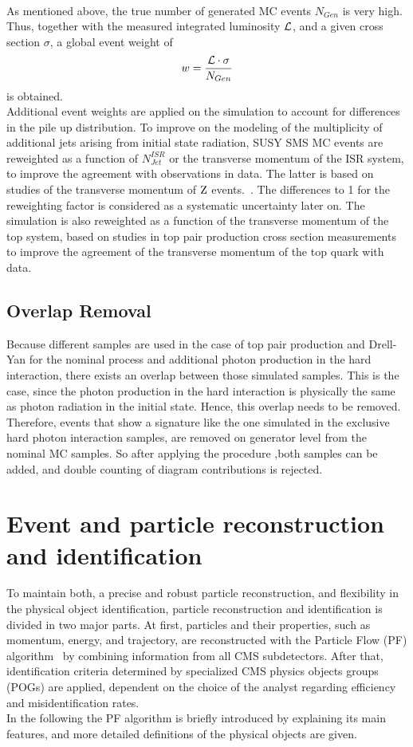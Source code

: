 \\
As mentioned above, the true number of generated MC events $N_{Gen}$ is very high. Thus, together with the measured integrated luminosity $\mathcal{L}$, and a given cross section $\sigma$, a global event weight of
\begin{equation}
 w = \frac{\mathcal{L} \cdot \sigma}{N_{Gen}}
\end{equation}
is obtained.\\
Additional event weights are applied on the simulation to account for differences in the pile up distribution. To improve on the \MADGRAPH modeling of the multiplicity of additional jets arising from initial state radiation, SUSY SMS MC events are reweighted as a function of $N^{ISR}_{Jet}$ or the transverse momentum of the ISR system, to improve the agreement with observations in data.
The latter is based on studies of the transverse momentum of $\mathrm{Z}$ events.~\cite{NISRweight}.
The differences to 1 for the reweighting factor is considered as a systematic uncertainty later on.
The \POWHEG \ttbar simulation is also reweighted as a function of the transverse momentum of the top system, based on studies in top pair production cross section measurements~\cite{topWeight1,topWeight2,topWeight3,topWeight4} to improve the agreement of the transverse momentum of the top quark with data.

\subsection{Overlap Removal}
Because different samples are used in the case of top pair production and Drell-Yan for the nominal process and additional photon production in the hard interaction, there exists an overlap between those simulated samples. This is the case, since the photon production in the hard interaction is physically the same as photon radiation in the initial state. Hence, this overlap needs to be removed. Therefore, events that show a signature like the one simulated in the exclusive hard photon interaction samples, are removed on generator level from the nominal MC samples. So after applying the procedure ,both samples can be added, and double counting of diagram contributions is rejected.

\section{Event and particle reconstruction and identification}
To maintain both, a precise and robust particle reconstruction, and flexibility in the physical object identification, particle reconstruction and identification is divided in two major parts. At first, particles and their properties, such as momentum, energy, and trajectory, are reconstructed with the Particle Flow (PF) algorithm~\cite{ParticleFlow} by combining information from all CMS subdetectors. After that, identification criteria determined by specialized CMS physics objects groups (POGs) are applied, dependent on the choice of the analyst regarding efficiency and misidentification rates.\\
In the following the PF algorithm is briefly introduced by explaining its main features, and more detailed definitions of the physical objects are given.

